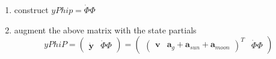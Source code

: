 \begin{enumerate}
    \item construct $yPhip = \dot{\Phi} \Phi$
    
    \item augment the above matrix with the state partials 
        \begin{equation}
            yPhiP = 
            \begin{pmatrix} 
                \dot{\bm{y}} & \dot{\Phi} \Phi 
            \end{pmatrix}  = 
            \begin{pmatrix} 
                \begin{pmatrix} \bm{v} & \bm{a}_g + \bm{a}_{sun} + \bm{a}_{moon} \end{pmatrix}^T 
                & \dot{\Phi} \Phi
            \end{pmatrix}
        \end{equation}
\end{enumerate}